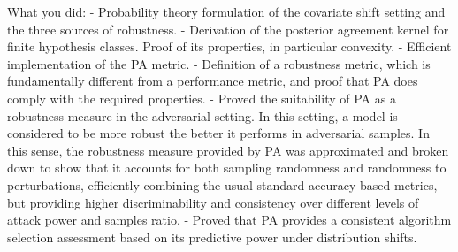 What you did:
- Probability theory formulation of the covariate shift setting and the three sources of robustness.
- Derivation of the posterior agreement kernel for finite hypothesis classes. Proof of its properties, in particular convexity.
- Efficient implementation of the PA metric.
- Definition of a robustness metric, which is fundamentally different from a performance metric, and proof that PA
does comply with the required properties.
- Proved the suitability of PA as a robustness measure in the adversarial setting. In this setting, a model is considered to
be more robust the better it performs in adversarial samples. In this sense, the robustness measure provided by PA was approximated
and broken down to show that it accounts for both sampling randomness and randomness to perturbations, efficiently combining
the usual standard accuracy-based metrics, but providing higher discriminability and consistency over different levels of
attack power and samples ratio.
- Proved that PA provides a consistent algorithm selection assessment based on its predictive power under distribution shifts.

\cleardoublepage
